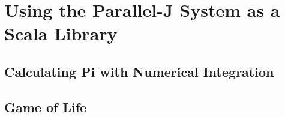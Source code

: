 \chapter{Using the Parallel-J System as a Scala Library}
\label{apsol}

\section{Calculating Pi with Numerical Integration}
\label{pjsPi}
\begin{singlespacing} 
\begin{small}
\end{small}
\end{singlespacing}

\section{Game of Life}
\label{pjsGol}
